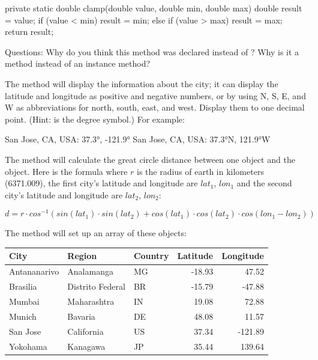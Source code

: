 \begin{exercise}
\begin{code}
private static double clamp(double value, double min, double max) {
    double result = value;
    if (value <  min) {
        result = min;
    }
    else if (value > max) {
        result = max;
    }
    return result;
}
\end{code}


Questions: Why do you think this method was declared  instead of ? Why is it a  method instead of an instance method?

The  method will display the information about the city; it can display the latitude and longitude as positive and negative numbers, or by using N, S, E, and W as abbreviations for north, south, east, and west. Display them to one decimal point. (Hint:  is the degree symbol.) For example:

\begin{stdout}
San Jose, CA, USA: 37.3°, -121.9°
San Jose, CA, USA: 37.3°N, 121.9°W
\end{stdout}


The  method will calculate the great circle distance between one  object and the   object. Here is the formula where $r$ is the radius of earth in kilometers (6371.009), the first city's latitude and longitude are $lat_1$, $lon_1$ and the second city's latitude and longitude are  $lat_2$, $lon_2$:

\begin{equation*}
d = r\cdot cos^{-1}(sin(lat_1)\cdot sin(lat_2) + cos(lat_1)\cdot cos(lat_2)\cdot cos(lon_1 - lon_2))
\end{equation*}

The  method will set up an array of these  objects:

\begin{tabular}{|l|l|l|r|r|}
\hline
City & Region & Country & Latitude & Longitude \\ \hline
Antananarivo & Analamanga & MG & -18.93 & 47.52 \\ \hline
Brasilia & Distrito Federal & BR & -15.79 & -47.88 \\ \hline
Mumbai & Maharashtra & IN & 19.08 & 72.88 \\ \hline
Munich & Bavaria & DE & 48.08 & 11.57 \\ \hline
San Jose & California & US & 37.34 & -121.89 \\ \hline
Yokohama & Kanagawa & JP & 35.44 & 139.64 \\ \hline
\end{tabular}


\end{exercise}

